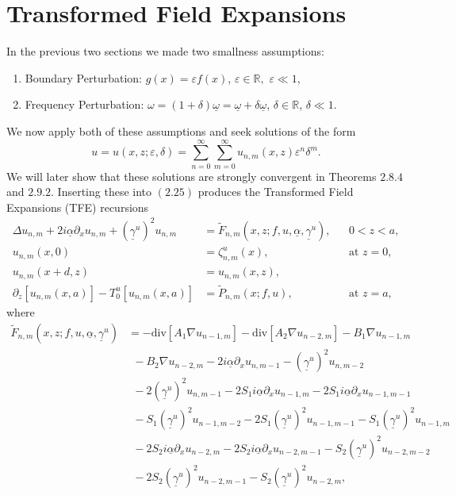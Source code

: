 \section{Transformed Field Expansions}
\label{intro:transformed_field_expansions}

In the previous two sections we made two smallness assumptions:
\begin{enumerate}
\item Boundary Perturbation: $g(x) = \varepsilon f(x)$,
  $\varepsilon \in \mathbb R,$ $\varepsilon \ll 1$,
\item Frequency Perturbation: 
  $\omega = (1 + \delta) \underline{\omega} 
  = \underline{\omega} + \delta \underline{\omega}$,
  $\delta \in \mathbb R$, $\delta \ll 1$.
\end{enumerate}
We now apply both of these assumptions and seek solutions of the form
\begin{equation}u=u(x,z;\varepsilon,\delta)=\sum_{n=0}^{\infty}\sum_{m=0}^{\infty}u_{n,m}(x,z)\varepsilon^n\delta^m. \end{equation}
We will later show that these solutions are strongly convergent in Theorems $2.8.4$ and $2.9.2$. Inserting these into $(2.25)$ produces the Transformed Field Expansions (TFE) recursions 
\begin{subequations}
\begin{align}
\Delta u_{n,m} +2i\underline{\alpha}\partial_{x}u_{n,m}+(\underline{\gamma}^u)^2u_{n,m}&=\tilde{F}_{n,m}\left(x,z;f,u,\underline{\alpha},\underline{\gamma}^u\right),&&\text{$0<z<a$}, \\
u_{n,m}(x,0)&=\zeta_{n,m}^u(x),&&\text{at $z=0$},\\
u_{n,m}(x+d,z)&=u_{n,m}(x,z), \\
\partial_z \left[u_{n,m}(x,a)\right] - T_0^u[u_{n,m}(x,a)]&=\tilde{P}_{n,m}(x;f,u),&&\text{at $z=a$},
\end{align}
\end{subequations}
where
\begin{align}
\tilde{F}_{n,m}\left(x,z;f,u,\underline{\alpha},\underline{\gamma}^u\right)&=-\text{div}[A_1\nabla u_{n-1,m}]-\text{div}[A_2\nabla u_{n-2,m}]-B_1\nabla u_{n-1,m} \nonumber
\\&~~- B_2\nabla u_{n-2,m}-2i\underline{\alpha}\partial_xu_{n,m-1}-(\underline{\gamma}^u)^2u_{n,m-2}\nonumber
\\&~~-2(\underline{\gamma}^u)^2u_{n,m-1}-2S_1i\underline{\alpha}\partial_xu_{n-1,m}-2S_1i\underline{\alpha}\partial_xu_{n-1,m-1}
\\&~~-S_1(\underline{\gamma}^u)^2u_{n-1,m-2}-2S_1(\underline{\gamma}^u)^2u_{n-1,m-1}-S_1(\underline{\gamma}^u)^2u_{n-1,m}\nonumber
\\&~~-2S_2i\underline{\alpha}\partial_xu_{n-2,m}-2S_2i\underline{\alpha}\partial_xu_{n-2,m-1}-S_2(\underline{\gamma}^u)^2u_{n-2,m-2}\nonumber
\\&~~-2S_2(\underline{\gamma}^u)^2u_{n-2,m-1}-S_2(\underline{\gamma}^u)^2u_{n-2,m}\nonumber,
\end{align}
